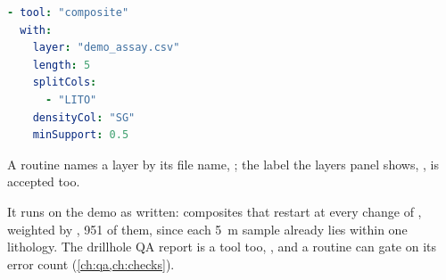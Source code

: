 \begin{lstlisting}[language=yaml]
- tool: "composite"
  with:
    layer: "demo_assay.csv"
    length: 5
    splitCols:
      - "LITO"
    densityCol: "SG"
    minSupport: 0.5
\end{lstlisting}

A routine names a layer by its file name, ; the label the layers panel shows, , is accepted too.

It runs on the demo as written: composites that restart at every change of , weighted by , 951 of them, since each 5~m sample already lies within one lithology. The drillhole QA report is a tool too, , and a routine can gate on its error count (\cref{ch:qa,ch:checks}).
